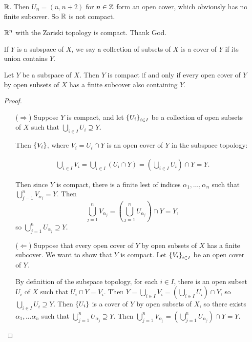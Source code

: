 \documentclass[12pt, twosided]{article}
\begin{document}
\begin{exa}
  \(\mathbb{R}\). Then \(U_n = (n, n+2)\) for \(n \in \mathbb{Z}\) form an open cover, which obviously has no finite subcover. So \(\mathbb{R}\) is not compact.
\end{exa}

\begin{fact}
  \(\mathbb{R}^n\) with the Zariski topology is compact. Thank God.
\end{fact}

\begin{df}
  If \(Y\) is a subspace of \(X\), we say a collection of subsets of \(X\) is a cover of \(Y\) if its union contains \(Y\).
\end{df}

\begin{lm}
  Let \(Y\) be a subspace of \(X\). Then \(Y\) is compact if and only if every open cover of \(Y\) by open subsets of \(X\) has a finite subcover also containing \(Y\).
\end{lm}
\begin{proof}
  \begin{enumerate}
  \item [(\(\Rightarrow\))] Suppose \(Y\) is compact, and let \(\left\{ U_i \right\}_{i \in I}\) be a collection of open subsets of \(X\) such that \(\bigcup_{i \in I} U_i \supseteq Y\).

    Then \(\left\{ V_i \right\}\), where \(V_i = U_i \cap Y\) is an open cover of \(Y\) in the subspace topology:

    \begin{align*}
      \bigcup_{i \in I} V_i = \bigcup_{i \in I} (U_i \cap Y) = \left(\bigcup_{i \in I} U_i \right) \cap Y = Y.
    \end{align*}

    Then since \(Y\) is compact, there is a finite lest of indices \(\alpha_1, \ldots, \alpha_n\) such that \(\bigcup_{j = 1}^n V_{\alpha_j} = Y\). Then \[\bigcup_{j = 1}^n V_{\alpha_j} = \left(\bigcup_{j = 1}^n U_{\alpha_j}\right) \cap Y = Y,\] so \(\bigcup_{j = 1}^nU_{\alpha_j} \supseteq Y\).
  \item [(\(\Leftarrow\))] Suppose that every open cover of \(Y\) by open subsets of \(X\) has a finite subcover. We want to show that \(Y\) is compact. Let \(\left\{ V_i \right\}_{i \in I}\) be an open cover of \(Y\).

    By definition of the subspace topology, for each \(i \in I\), there is an open subset \(U_i\) of \(X\) such that \(U_i \cap Y = V_i\). Then \(Y = \bigcup_{i \in I} V_i = \left( \bigcup_{i \in I} U_i\right) \cap Y\), so \(\bigcup_{i \in I} U_i \supseteq Y\). Then \(\left\{ U_i \right\}\) is a cover of \(Y\) by open subsets of \(X\), so there exists \(\alpha_1, \ldots \alpha_n\) such that \(\bigcup_{j = 1}^n U_{\alpha_j} \supseteq Y\). Then \(\bigcup_{j = 1}^n V_{\alpha_j} = \left( \bigcup_{j = 1}^nU_{\alpha_j}\right) \cap Y = Y\).
  \end{enumerate}
\end{proof}
\end{document}
